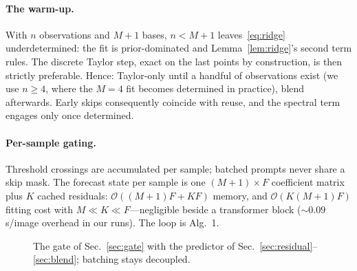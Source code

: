 \documentclass[10pt,twocolumn,letterpaper]{article}
\begin{document}
\paragraph{The warm-up.}
With $n$ observations and $M{+}1$ bases, $n < M{+}1$ leaves~\eqref{eq:ridge}
underdetermined: the fit is prior-dominated and Lemma~\ref{lem:ridge}'s
second term rules. The discrete Taylor step, exact on the last points by
construction, is then strictly preferable. Hence: Taylor-only until a
handful of observations exist (we use $n \ge 4$, where the $M{=}4$ fit
becomes determined in practice), blend afterwards. Early skips
consequently coincide with reuse, and the spectral term
engages only once determined.
\paragraph{Per-sample gating.}
Threshold crossings are accumulated per sample; batched prompts never
share a skip mask. The forecast state per sample is one
$(M{+}1)\times F$ coefficient matrix plus $K$ cached residuals:
$\mathcal{O}((M{+}1)F + KF)$ memory, and
$\mathcal{O}(K(M{+}1)F)$ fitting cost with $M \ll K \ll F$---negligible
beside a transformer block (${\sim}0.09$\,s/image overhead in our
runs). The loop is Alg.~1.

\begin{figure}[t]
  \centering
  \caption{The gate of Sec.~\ref{sec:gate} with the predictor of
  Sec.~\ref{sec:residual}--\ref{sec:blend}; batching stays decoupled.}
  \label{fig:algo}
\end{figure}
\end{document}
